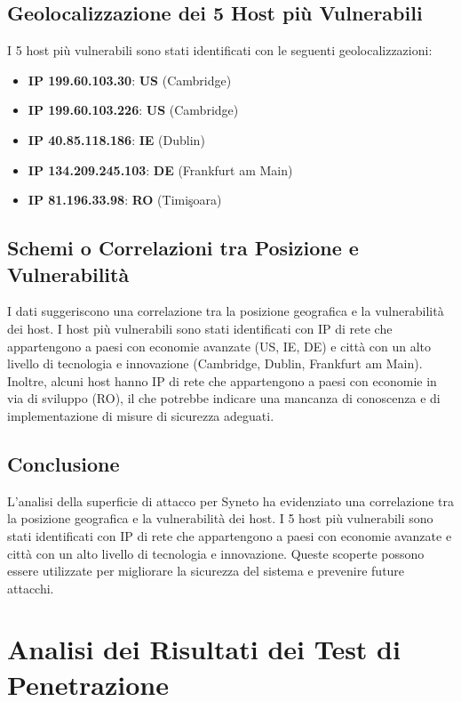 \section{Geolocalizzazione dei 5 Host più Vulnerabili}

I 5 host più vulnerabili sono stati identificati con le seguenti geolocalizzazioni:
\begin{itemize}
\item \textbf{IP 199.60.103.30}: \textbf{US} (Cambridge)
\item \textbf{IP 199.60.103.226}: \textbf{US} (Cambridge)
\item \textbf{IP 40.85.118.186}: \textbf{IE} (Dublin)
\item \textbf{IP 134.209.245.103}: \textbf{DE} (Frankfurt am Main)
\item \textbf{IP 81.196.33.98}: \textbf{RO} (Timişoara)
\end{itemize}
\section{Schemi o Correlazioni tra Posizione e Vulnerabilità}

I dati suggeriscono una correlazione tra la posizione geografica e la vulnerabilità dei host. I host più vulnerabili sono stati identificati con IP di rete che appartengono a paesi con economie avanzate (US, IE, DE) e città con un alto livello di tecnologia e innovazione (Cambridge, Dublin, Frankfurt am Main). Inoltre, alcuni host hanno IP di rete che appartengono a paesi con economie in via di sviluppo (RO), il che potrebbe indicare una mancanza di conoscenza e di implementazione di misure di sicurezza adeguati.

\section{Conclusione}

L'analisi della superficie di attacco per Syneto ha evidenziato una correlazione tra la posizione geografica e la vulnerabilità dei host. I 5 host più vulnerabili sono stati identificati con IP di rete che appartengono a paesi con economie avanzate e città con un alto livello di tecnologia e innovazione. Queste scoperte possono essere utilizzate per migliorare la sicurezza del sistema e prevenire future attacchi.

\chapter{Analisi dei Risultati dei Test di Penetrazione}

